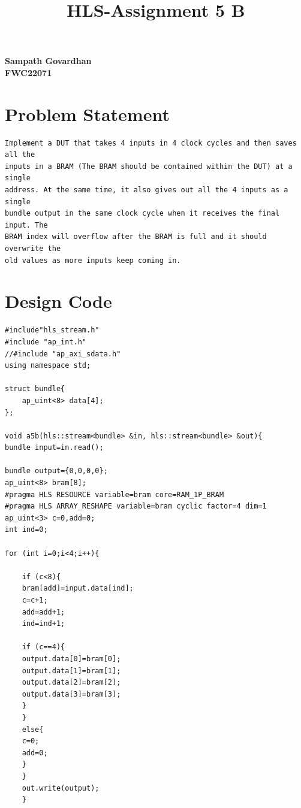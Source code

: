 \documentclass{article}
\title{
HLS-Assignment 5 B
}
\begin{document}
\maketitle
\hfill \textbf{Sampath Govardhan} \\
\null \hfill \textbf{FWC22071}\\

\section{Problem Statement}
\begin{lstlisting}
Implement a DUT that takes 4 inputs in 4 clock cycles and then saves all the 
inputs in a BRAM (The BRAM should be contained within the DUT) at a single 
address. At the same time, it also gives out all the 4 inputs as a single 
bundle output in the same clock cycle when it receives the final input. The 
BRAM index will overflow after the BRAM is full and it should overwrite the 
old values as more inputs keep coming in.

\end{lstlisting}
\vspace{3cm}

\section{Design Code}
\begin{lstlisting}
#include"hls_stream.h"
#include "ap_int.h"
//#include "ap_axi_sdata.h"
using namespace std;

struct bundle{
	ap_uint<8> data[4];
};

void a5b(hls::stream<bundle> &in, hls::stream<bundle> &out){
bundle input=in.read();

bundle output={0,0,0,0};
ap_uint<8> bram[8];
#pragma HLS RESOURCE variable=bram core=RAM_1P_BRAM
#pragma HLS ARRAY_RESHAPE variable=bram cyclic factor=4 dim=1
ap_uint<3> c=0,add=0;
int ind=0;

for (int i=0;i<4;i++){

	if (c<8){
	bram[add]=input.data[ind];
	c=c+1;
	add=add+1;
	ind=ind+1;

	if (c==4){
	output.data[0]=bram[0];
	output.data[1]=bram[1];
	output.data[2]=bram[2];
	output.data[3]=bram[3];
	}
	}
	else{
	c=0;
	add=0;
	}
	}
	out.write(output);
	}


\end{lstlisting}
\vspace{5cm}
\end{document}

